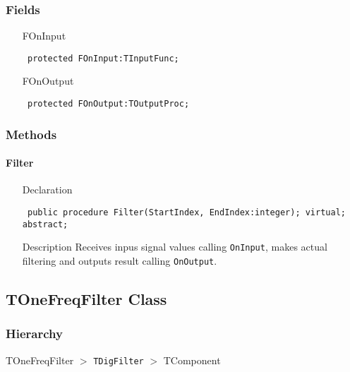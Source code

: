 \documentclass[12pt,a4paper,oneside]{report}
\newcommand{\declarationitem}[1]{{\addfontfeatures{FakeBold=1.3} #1}}
\newcommand{\descriptiontitle}[1]{{\addfontfeatures{FakeSlant}#1}}
\newcommand{\code}[1]{\texttt{#1}}
\begin{document}
\subsubsection{Fields}
\begin{itemize}\label{lmfilters.TDigFilter-FOnInput}
	\item[\declarationitem{FOnInput}\hfill]
	\begin{flushleft}
		\code{
			protected FOnInput:TInputFunc;}
	\end{flushleft}
	\par  \label{lmfilters.TDigFilter-FOnOutput}
	\item[\declarationitem{FOnOutput}\hfill]
	\begin{flushleft}
		\code{
			protected FOnOutput:TOutputProc;}
	\end{flushleft}
	\par  \end{itemize}
\subsubsection{Methods}
\paragraph{Filter}\hspace*{\fill}
\label{lmfilters.TDigFilter-Filter}
\begin{itemize}\item[\declarationitem{Declaration}\hfill]
	\begin{flushleft}
		\code{
			public procedure Filter(StartIndex, EndIndex:integer); virtual; abstract;}
		
	\end{flushleft}
	
	\par
	\item[\descriptiontitle{Description}]
	Receives inpus signal values calling \code{OnInput}, makes actual filtering and outputs result calling \code{OnOutput}.
\end{itemize}
\subsection{TOneFreqFilter Class}
\label{lmfilters.TOneFreqFilter}
\subsubsection{Hierarchy}
TOneFreqFilter {$>$} \code{TDigFilter} {$>$} 
TComponent
\end{document}
